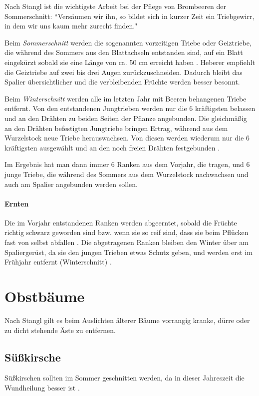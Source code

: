 Nach Stangl \cite[S.~196]{Stangl1995} ist die wichtigste Arbeit bei der Pflege von Brombeeren der Sommerschnitt:
``Versäumen wir ihn, so bildet sich in kurzer Zeit ein Triebgewirr, in dem wir uns kaum mehr zurecht finden."

Beim \textit{Sommerschnitt} werden die sogenannten vorzeitigen Triebe oder Geiztriebe, die während des Sommers aus den Blattachseln entstanden sind, auf ein Blatt eingekürzt sobald sie eine Länge von ca. 50 cm erreicht haben \cite[S.~196]{Stangl1995}.
Heberer \cite[S.~108]{Heberer2018} empfiehlt die Geiztriebe auf zwei bis drei Augen zurückzuschneiden.
Dadurch bleibt das Spalier übersichtlicher und die verbleibenden Früchte werden besser besonnt.

Beim \textit{Winterschnitt} werden alle im letzten Jahr mit Beeren behangenen Triebe entfernt.
Von den entstandenen Jungtrieben werden nur die 6 kräftigsten belassen und an den Drähten zu beiden Seiten der Pflanze angebunden.
Die gleichmäßig an den Drähten befestigten Jungtriebe bringen Ertrag, während aus dem Wurzelstock neue Triebe herauswachsen.
Von diesen werden wiederum nur die 6 kräftigsten ausgewählt und an den noch freien Drähten festgebunden \cite[S.~197]{Stangl1995}.

Im Ergebnis hat man dann immer 6 Ranken aus dem Vorjahr, die tragen, und 6 junge Triebe, die während des Sommers aus dem Wurzelstock nachwachsen und auch am Spalier angebunden werden sollen.

\paragraph{Ernten}

Die im Vorjahr entstandenen Ranken werden abgeerntet, sobald die Früchte richtig schwarz geworden sind bzw. wenn sie so reif sind, dass sie beim Pflücken fast von selbst abfallen \cite[S.~176]{Seymour1978}.
Die abgetragenen Ranken bleiben den Winter über am Spaliergerüst, da sie den jungen Trieben etwas Schutz geben, und werden erst im Frühjahr entfernt (\textrightarrow Winterschnitt) \cite[S.~197]{Stangl1995}.

\vfill
\pagebreak

\section{Obstbäume}
\label{Bäume}

Nach Stangl \cite[S.~256]{Stangl1995} gilt es beim Auslichten älterer Bäume vorrangig kranke, dürre oder zu dicht stehende Äste zu entfernen.

\subsection{Süßkirsche}
\label{Süßkirsche}

Süßkirschen sollten im Sommer geschnitten werden, da in dieser Jahreszeit die Wundheilung besser ist \cite[S.~109]{Heberer2018}.



\pagebreak